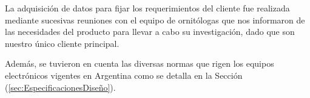La adquisición de datos para fijar los requerimientos del cliente fue realizada mediante sucesivas reuniones con el equipo de ornitólogas que nos informaron de las necesidades del producto para llevar a cabo su investigación, dado que son nuestro único cliente principal.

Además, se tuvieron en cuenta las diversas normas que rigen los equipos electrónicos vigentes en Argentina como se detalla en la Sección (\ref{sec:EspecificacionesDiseño}). 